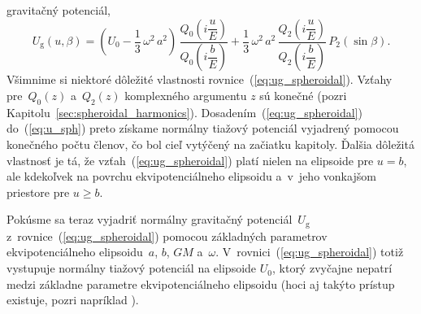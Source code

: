 \documentclass[a4paper, 12pt]{book}
\newcommand{\gidx}{\mathrm g}
\begin{document}
gravitačný potenciál,
%
\begin{equation}
\label{eq:ug_spheroidal}
U_\gidx(u, \beta) = \left( U_0 - \frac{1}{3} \, \omega^2 \, a^2 \right) \, 
\frac{Q_0\left( i \dfrac{u}{E} \right)}{Q_0\left( i \dfrac{b}{E} \right)} 
+ \frac{1}{3} \, \omega^2 \, a^2  \, \frac{Q_2\left( i \dfrac{u}{E} 
\right)}{Q_2\left( i \dfrac{b}{E} \right)} \, P_2(\sin\beta){.}
\end{equation}
%
Všimnime si niektoré dôležité vlastnosti rovnice~(\ref{eq:ug_spheroidal}).  
Vzťahy pre~$Q_0(z)$ a~$Q_2(z)$ komplexného argumentu $z$ sú konečné (pozri 
Kapitolu~\ref{sec:spheroidal_harmonics}).  Dosadením~(\ref{eq:ug_spheroidal}) 
do~(\ref{eq:u_sph}) preto získame normálny tiažový potenciál vyjadrený pomocou 
konečného počtu členov, čo bol cieľ vytýčený na začiatku kapitoly.  Ďalšia 
dôležitá vlastnosť je tá, že vzťah~(\ref{eq:ug_spheroidal}) platí nielen na 
elipsoide pre $u = b$, ale kdekoľvek na povrchu ekvipotenciálneho elipsoidu 
a~v~jeho vonkajšom priestore pre $u \geq b$.

Pokúsme sa teraz vyjadriť normálny gravitačný potenciál~$U_\gidx$ 
z~rovnice~(\ref{eq:ug_spheroidal}) pomocou základných parametrov 
ekvipotenciálneho elipsoidu~$a$, $b$, $GM$ a~$\omega$.  
V~rovnici~(\ref{eq:ug_spheroidal}) totiž vystupuje normálny tiažový potenciál 
na elipsoide $U_0$, ktorý zvyčajne nepatrí medzi základne parametre 
ekvipotenciálneho elipsoidu (hoci aj takýto prístup existuje, pozri napríklad 
\cite{TorgeGeodesy}).
\end{document}
